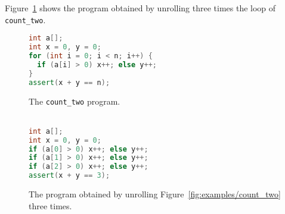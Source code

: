 %
Figure~\ref{fig:examples/count_two_unrolled} shows the
program obtained by unrolling three times the loop of \verb'count_two'.

\begin{figure}[tb]
\centering
\begin{minipage}{.52\textwidth}
  \centering
  {\begin{lstlisting}[language=cpp]
int a[];
int x = 0, y = 0;
for (int i = 0; i < n; i++) {
  if (a[i] > 0) x++; else y++;
}
assert(x + y == n);
      \end{lstlisting}}
  \caption{The \texttt{count\_two} program.\\~}
  \label{fig:examples/count_two}
\end{minipage}%
\begin{minipage}{.48\textwidth}
  \centering
  {\begin{lstlisting}[language=cpp]
int a[];
int x = 0, y = 0;
if (a[0] > 0) x++; else y++;
if (a[1] > 0) x++; else y++;
if (a[2] > 0) x++; else y++;
assert(x + y == 3);
      \end{lstlisting}}
  \caption{The program obtained by unrolling
    Figure~\ref{fig:examples/count_two} three times.}
  \label{fig:examples/count_two_unrolled}
\end{minipage}
\end{figure}

